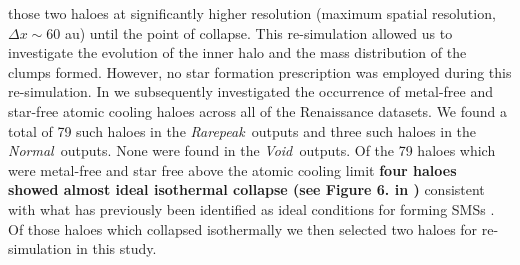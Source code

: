 \documentclass[twocolumn,iop,revtex4]{openjournal}
\newcommand{\rarepeak} {\textit{Rarepeak~}}
\newcommand{\normal} {\textit{Normal~}}
\newcommand{\void} {\textit{Void~}}
\begin{document}
 those two haloes at significantly higher resolution (maximum spatial resolution,
 $\Delta x \sim 60$ au) until the point of collapse. This re-simulation allowed us to investigate
 the evolution of the inner halo and the mass distribution of the clumps formed. However, no star
 formation prescription was employed during this re-simulation. In \cite{Regan_2020} we subsequently
 investigated the occurrence of metal-free and star-free atomic cooling haloes across all of the
 Renaissance datasets. We found a total of 79 such haloes in the
 \rarepeak outputs and three such haloes in the \normal outputs. None were found in the \void outputs.
 Of the 79 haloes which were metal-free and star free above the atomic cooling limit \textbf{four haloes showed almost ideal isothermal collapse (see Figure 6. in \cite{Regan_2020})} consistent with what has previously been identified
 as ideal conditions for forming SMSs \citep{Inayoshi_2014, Becerra_2015, Latif_2016a,
   Regan_2017, Chon_2017b, Regan_2018b}. Of those haloes which collapsed isothermally we then
 selected two haloes for re-simulation in this study. \\
\end{document}
